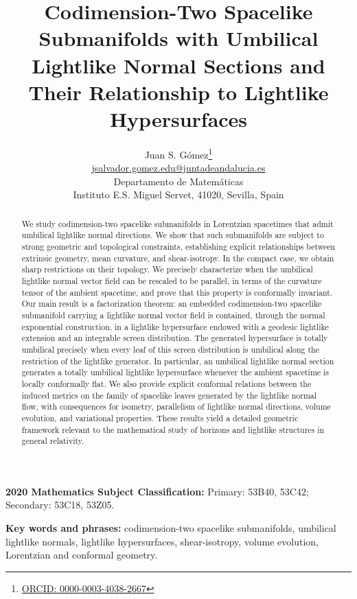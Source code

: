 \documentclass[11pt]{article}
\title{Codimension-Two Spacelike Submanifolds with Umbilical Lightlike Normal Sections and Their Relationship to Lightlike Hypersurfaces}
\author{
	Juan S. Gómez\thanks{\href{https://orcid.org/0000-0003-4038-2667}{ORCID: 0000-0003-4038-2667}} \\
	\href{mailto:jsalvador.gomez.edu@juntadeandalucia.es}{jsalvador.gomez.edu@juntadeandalucia.es} \\
	\small Departamento de Matemáticas \\
	\small Instituto E.S. Miguel Servet, 41020, Sevilla, Spain
}
\date{}
\numberwithin{equation}{section}
\begin{document}
	\maketitle
	\thispagestyle{empty}
	
	
	
	
	\begin{abstract}
		
		
We study codimension-two spacelike submanifolds in Lorentzian spacetimes that admit umbilical lightlike normal directions. We show that such submanifolds are subject to strong geometric and topological constraints, establishing explicit relationships between extrinsic geometry, mean curvature, and shear-isotropy. In the compact case, we obtain sharp restrictions on their topology. We precisely characterize when the umbilical lightlike normal vector field can be rescaled to be parallel, in terms of the curvature tensor of the ambient spacetime, and prove that this property is conformally invariant. Our main result is a factorization theorem: an embedded codimension-two spacelike submanifold carrying a lightlike normal vector field is contained, through the normal exponential construction, in a lightlike hypersurface endowed with a geodesic lightlike extension and an integrable screen distribution. The generated hypersurface is totally umbilical precisely when every leaf of this screen distribution is umbilical along the restriction of the lightlike generator. In particular, an umbilical lightlike normal section generates a totally umbilical lightlike hypersurface whenever the ambient spacetime is locally conformally flat. We also provide explicit conformal relations between the induced metrics on the family of spacelike leaves generated by the lightlike normal flow, with consequences for isometry, parallelism of lightlike normal directions, volume evolution, and variational properties. These results yield a detailed geometric framework relevant to the mathematical study of horizons and lightlike structures in general relativity.
	\end{abstract}
	
	\smallskip
	\noindent
	{\small\sffamily\bfseries 2020 Mathematics Subject Classification:}
	{\small Primary: 53B40, 53C42; Secondary: 53C18, 53Z05.}\par
	
	\smallskip
	\noindent
	{\small\sffamily\bfseries Key words and phrases:}
	{\small codimension-two spacelike submanifolds, umbilical lightlike normals,
	lightlike hypersurfaces, shear-isotropy, volume evolution, Lorentzian and
	conformal geometry.}
	\label{xyzt} 
	
\end{document}
